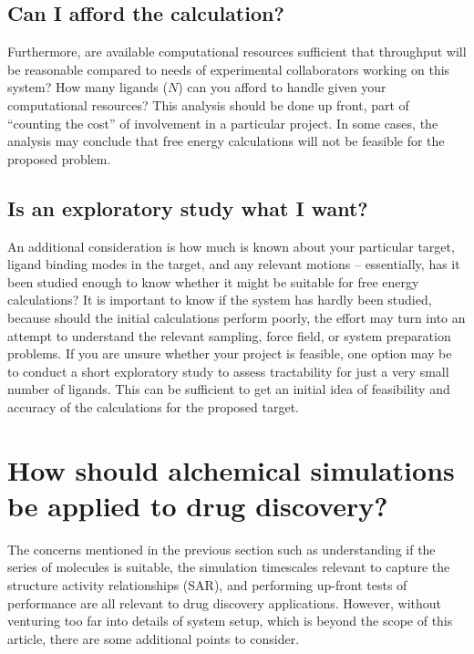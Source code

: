 \documentclass[9pt,bestpractices]{livecoms}
\begin{document}
\subsection*{Can I afford the calculation?}
Furthermore, are available computational resources sufficient that throughput will be
reasonable compared to needs of experimental collaborators working on
this system? How many ligands ($N$) can you afford to handle given
your computational resources?
This analysis should be done up front, part of ``counting the cost''
of involvement in a particular project. In some cases, the analysis may conclude that free energy calculations will not be feasible for the proposed problem.
%
\subsection*{Is an exploratory study what I want?}
An additional consideration is how much is known about your particular
target, ligand binding modes in the target, and any relevant motions
-- essentially, has it been studied enough to know whether it might be
suitable for free energy calculations? It is important to know if the system has hardly been studied, because should the initial calculations perform poorly, the effort may turn into an attempt to understand the relevant sampling, force field, or system preparation problems.
%
If you are unsure whether your project is feasible, one option may be
to conduct a short exploratory study to assess tractability for just a very small
number of ligands. This can be sufficient to get an initial
idea of feasibility and accuracy of the calculations for the
proposed target.
\section{How should alchemical simulations be applied to drug discovery?}


The concerns mentioned in the previous section such as understanding if the series of molecules is suitable, the simulation timescales relevant to capture the structure activity relationships (SAR), and performing up-front tests of performance are all relevant to drug discovery applications. However, without venturing too far into details of system setup, which is beyond the scope of this article, there are some additional points to consider. 
\end{document}
